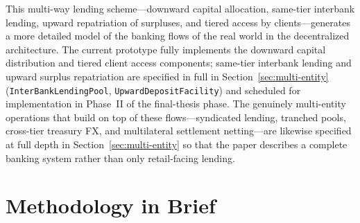 \documentclass[12pt,a4paper]{report}
\begin{document}
This multi-way lending scheme---downward capital allocation, same-tier interbank lending, upward repatriation of surpluses, and tiered access by clients---generates a more detailed model of the banking flows of the real world in the decentralized architecture. The current prototype fully implements the downward capital distribution and tiered client access components; same-tier interbank lending and upward surplus repatriation are specified in full in Section~\ref{sec:multi-entity} (\texttt{InterBankLendingPool}, \texttt{UpwardDepositFacility}) and scheduled for implementation in Phase~II of the final-thesis phase. The genuinely multi-entity operations that build on top of these flows---syndicated lending, tranched pools, cross-tier treasury FX, and multilateral settlement netting---are likewise specified at full depth in Section~\ref{sec:multi-entity} so that the paper describes a complete banking system rather than only retail-facing lending.

\section{Methodology in Brief}
\end{document}
